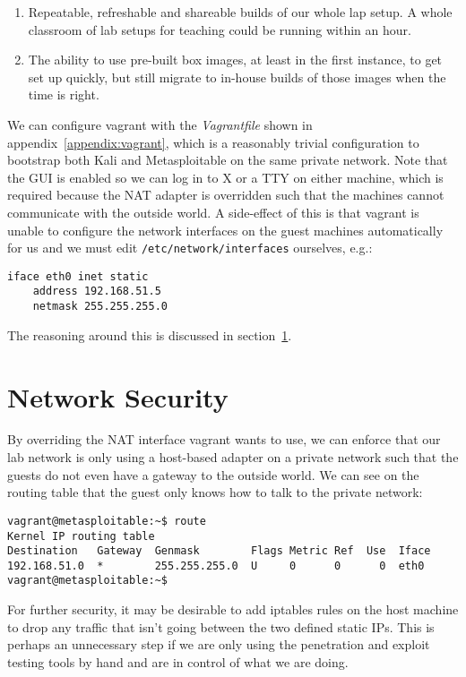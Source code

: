 \documentclass{report}
\begin{document}
\begin{enumerate}
\item Repeatable, refreshable and shareable builds of our whole lap setup. A whole classroom
  of lab setups for teaching could be running within an hour.
\item The ability to use pre-built box images, at least in the first instance, to get set up
  quickly, but still migrate to in-house builds of those images when the time is right.
\end{enumerate}

We can configure vagrant with the \emph{Vagrantfile} shown in appendix~\ref{appendix:vagrant},
which is a reasonably trivial configuration to bootstrap both Kali and Metasploitable on
the same private network. Note that the GUI is enabled so we can log in to X or a TTY
on either machine, which is required because the NAT adapter is overridden such that the
machines cannot communicate with the outside world. A side-effect of this is that
vagrant is unable to configure the network interfaces on the guest machines automatically
for us and we must edit \texttt{/etc/network/interfaces} ourselves, e.g.:

\begin{lstlisting}
iface eth0 inet static
    address 192.168.51.5
    netmask 255.255.255.0
\end{lstlisting}

The reasoning around this is discussed in section~\ref{sec:netsec}.

\section{Network Security}
\label{sec:netsec}

By overriding the NAT interface vagrant wants to use, we can enforce that
our lab network is only using a host-based adapter on a private network such
that the guests do not even have a gateway to the outside world. We can see
on the routing table that the guest only knows how to talk to the private
network:

\begin{lstlisting}
vagrant@metasploitable:~$ route
Kernel IP routing table
Destination   Gateway  Genmask        Flags Metric Ref  Use  Iface
192.168.51.0  *        255.255.255.0  U     0      0      0  eth0
vagrant@metasploitable:~$
\end{lstlisting}

For further security, it may be desirable to add iptables rules on the host
machine to drop any traffic that isn't going between the two defined
static IPs. This is perhaps an unnecessary step if we are only using the
penetration and exploit testing tools by hand and are in control of what
we are doing.
\end{document}

